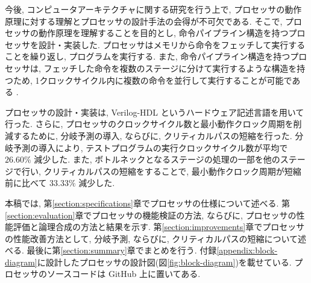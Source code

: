 \documentclass[../main.tex]{subfiles}
\begin{document}
  今後, コンピュータアーキテクチャに関する研究を行う上で, 
  プロセッサの動作原理に対する理解とプロセッサの設計手法の会得が不可欠である.
  そこで, プロセッサの動作原理を理解することを目的とし, 
  命令パイプライン構造を持つプロセッサを設計・実装した.
  プロセッサはメモリから命令をフェッチして実行することを繰り返し, プログラムを実行する.
  また, 命令パイプライン構造を持つプロセッサは, 
  フェッチした命令を複数のステージに分けて実行するような構造を持つため, 
  1クロックサイクル内に複数の命令を並行して実行することが可能である \cite{ca-quantitative-approach}.

  プロセッサの設計・実装は, Verilog-HDL というハードウェア記述言語を用いて行った.
  さらに, プロセッサのクロックサイクル数と最小動作クロック周期を削減するために, 
  分岐予測の導入, ならびに, クリティカルパスの短縮を行った.
  分岐予測の導入により, テストプログラムの実行クロックサイクル数が平均で $26.60\%$ 減少した.
  また, ボトルネックとなるステージの処理の一部を他のステージで行い, 
  クリティカルパスの短縮をすることで, 
  最小動作クロック周期が短縮前に比べて $33.33\%$ 減少した.

  本稿では, 第\ref{section:specifications}章でプロセッサの仕様について述べる.
  第\ref{section:evaluation}章でプロセッサの機能検証の方法, ならびに, プロセッサの性能評価と論理合成の方法と結果を示す.
  第\ref{section:improvements}章でプロセッサの性能改善方法として, 分岐予測, ならびに, クリティカルパスの短縮について述べる.
  最後に第\ref{section:summary}章でまとめを行う.
  付録\ref{appendix:block-diagram}に設計したプロセッサの設計図(図\ref{fig:block-diagram})を載せている.
  プロセッサのソースコードは GitHub \footnotemark 上に置いてある.
\end{document}
